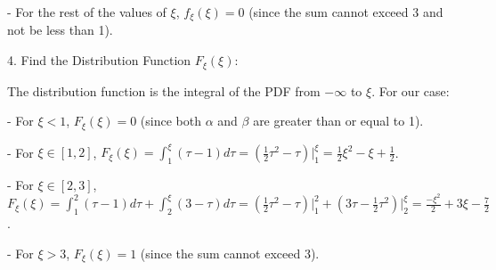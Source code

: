 - For the rest of the values of \(\xi\), \(f_{\xi}(\xi) = 0\) (since the sum cannot exceed 3 and not be less than 1).

4. Find the Distribution Function \(F_{\xi}(\xi)\):

The distribution function is the integral of the PDF from \(-\infty\) to \(\xi\). For our case:

- For \(\xi < 1\), \(F_{\xi}(\xi) = 0\) (since both \(\alpha\) and \(\beta\) are greater than or equal to 1).

- For \(\xi \in [1, 2]\), \(F_{\xi}(\xi) = \int_{1}^{\xi} (\tau - 1) d\tau = (\frac{1}{2}\tau^2 - \tau) \Big|_{1}^{\xi} = \frac{1}{2}\xi^2 - \xi + \frac{1}{2}\).

- For \(\xi \in [2, 3]\), \(F_{\xi}(\xi) = \int_{1}^{2} (\tau - 1) d\tau + \int_{2}^{\xi} (3 - \tau) d\tau  = (\frac{1}{2}\tau^2 - \tau) \Big|_{1}^{2} + (3\tau - \frac{1}{2}\tau^2) \Big|_{2}^{\xi} = \frac{-\xi^2}{2} + 3\xi - \frac{7}{2} \).

- For \(\xi > 3\), \(F_{\xi}(\xi) = 1\) (since the sum cannot exceed 3).